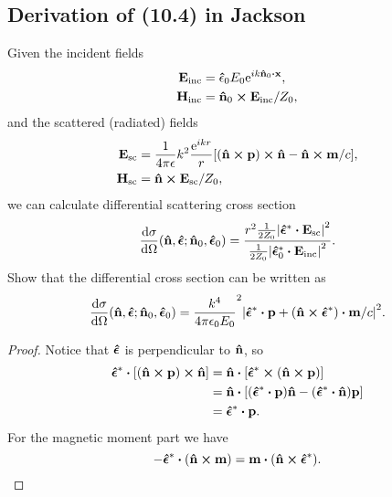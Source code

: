 \documentclass[10pt]{article}
\begin{document}
\subsection{Derivation of (10.4) in Jackson}
Given the incident fields
\begin{align*}
	\vb{E}_{\mathrm{inc}} &= \vu{\epsilon}_0 E_0 \e^{i k \vu{n}_0\vdot \vb{x}}, \\
	\vb{H}_{\mathrm{inc}} &= \vu{n}_0 \cross \vb{E}_{\mathrm{inc}} / Z_0,
\end{align*}
and the scattered (radiated) fields
\begin{align*}
	\vb{E}_{\mathrm{sc}} &= \frac{1}{4 \pi \epsilon} k^2 \frac{{\mathrm{e}}^{ikr}}{r} [(\vu{n} \cross \vb{p}) \cross \vu{n} - \vu{n} \cross \vb{m} / c], \\
	\vb{H}_{\mathrm{sc}} &= \vu{n} \cross \vb{E}_{\mathrm{sc}} / Z_0,
\end{align*}
we can calculate differential scattering cross section
\begin{equation}
	\frac{\dd{\sigma}}{\dd{\Omega}}(\vu{n}, \vu*{\epsilon}; \vu{n}_0, \vu*{\epsilon}_0) = \frac{r^2 \frac{1}{2Z_0} \abs{\vu*{\epsilon}^* \vdot \vb{E}_{\mathrm{sc}}}^2}{\frac{1}{2Z_0} \abs{\vu*{\epsilon}_0^* \vdot \vb{E}_{\mathrm{inc}}}^2}.
\end{equation}
Show that the differential cross section can be written as
\begin{equation}
	\frac{\dd{\sigma}}{\dd{\Omega}}(\vu{n}, \vu*{\epsilon}; \vu{n}_0, \vu*{\epsilon}_0) =
	\frac{k^4}{4\pi \epsilon_0 E_0}^2 \abs{\vu*{\epsilon}^* \vdot \vb{p} + (\vu{n} \cross \vu*{\epsilon}^*) \vdot \vb{m}/c}^2.
\end{equation}
\begin{proof}
	Notice that $\vu*{\epsilon}$ is perpendicular to $\vu{n}$, so
	\begin{align*}
		\vu*{\epsilon}^* \vdot [(\vu{n} \cross \vb{p}) \cross \vu{n}] &= \vu{n} \vdot [\vu*{\epsilon}^* \cross (\vu{n} \cross \vb{p})] \\
		&= \vu{n} \vdot [(\vu*{\epsilon}^* \vdot \vb{p}) \vu{n} - (\vu*{\epsilon}^* \vdot \vu{n}) \vb{p}] \\
		&= \vu*{\epsilon}^* \vdot \vb{p}.
	\end{align*}
	For the magnetic moment part we have
	\begin{equation}
		- \vu*{\epsilon}^* \vdot (\vu{n} \cross \vb{m}) = \vb{m} \vdot (\vu{n} \cross \vu*{\epsilon}^*).
	\end{equation}
\end{proof}
\end{document}
